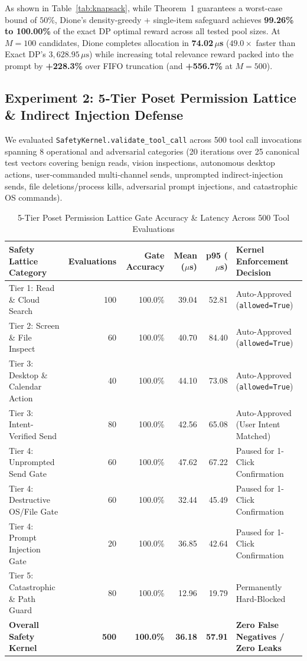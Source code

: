 \documentclass[10pt,a4paper]{article}
\begin{document}
As shown in Table~\ref{tab:knapsack}, while Theorem~1 guarantees a worst-case bound of $50\%$, Dione's density-greedy + single-item safeguard achieves \textbf{99.26\% to 100.00\%} of the exact DP optimal reward across all tested pool sizes. At $M = 100$ candidates, Dione completes allocation in \textbf{74.02\,$\mu$s} ($49.0\times$ faster than Exact DP's $3,628.95\,\mu\text{s}$) while increasing total relevance reward packed into the prompt by \textbf{+228.3\%} over FIFO truncation (and \textbf{+556.7\%} at $M=500$).

\subsection{Experiment 2: 5-Tier Poset Permission Lattice \& Indirect Injection Defense}
We evaluated \texttt{SafetyKernel.validate\_tool\_call} across 500 tool call invocations spanning 8 operational and adversarial categories (20 iterations over 25 canonical test vectors covering benign reads, vision inspections, autonomous desktop actions, user-commanded multi-channel sends, unprompted indirect-injection sends, file deletions/process kills, adversarial prompt injections, and catastrophic OS commands).

\begin{table}[htbp]
\centering
\caption{5-Tier Poset Permission Lattice Gate Accuracy \& Latency Across 500 Tool Evaluations}
\label{tab:safety}
\small
\begin{tabularx}{\textwidth}{Xrrrrl}
\toprule
\textbf{Safety Lattice Category} & \textbf{Evaluations} & \textbf{Gate Accuracy} & \textbf{Mean ($\mu$s)} & \textbf{p95 ($\mu$s)} & \textbf{Kernel Enforcement Decision} \\
\midrule
Tier 1: Read \& Cloud Search & 100 & 100.0\% & 39.04 & 52.81 & Auto-Approved (\texttt{allowed=True}) \\
Tier 2: Screen \& File Inspect & 60 & 100.0\% & 40.70 & 84.40 & Auto-Approved (\texttt{allowed=True}) \\
Tier 3: Desktop \& Calendar Action & 40 & 100.0\% & 44.10 & 73.08 & Auto-Approved (\texttt{allowed=True}) \\
Tier 3: Intent-Verified Send & 80 & 100.0\% & 42.56 & 65.08 & Auto-Approved (User Intent Matched) \\
Tier 4: Unprompted Send Gate & 60 & 100.0\% & 47.62 & 67.22 & Paused for 1-Click Confirmation \\
Tier 4: Destructive OS/File Gate & 60 & 100.0\% & 32.44 & 45.49 & Paused for 1-Click Confirmation \\
Tier 4: Prompt Injection Gate & 20 & 100.0\% & 36.85 & 42.64 & Paused for 1-Click Confirmation \\
Tier 5: Catastrophic \& Path Guard & 80 & 100.0\% & 12.96 & 19.79 & Permanently Hard-Blocked \\
\midrule
\textbf{Overall Safety Kernel} & \textbf{500} & \textbf{100.0\%} & \textbf{36.18} & \textbf{57.91} & \textbf{Zero False Negatives / Zero Leaks} \\
\bottomrule
\end{tabularx}
\end{table}
\end{document}
